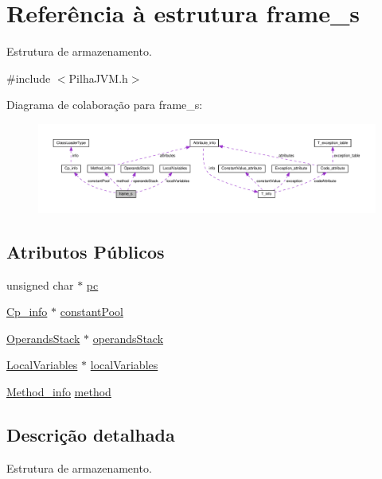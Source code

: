 \hypertarget{structframe__s}{}\section{Referência à estrutura frame\+\_\+s}
\label{structframe__s}


Estrutura de armazenamento.  




{\ttfamily \#include $<$Pilha\+J\+V\+M.\+h$>$}



Diagrama de colaboração para frame\+\_\+s\+:\nopagebreak
\begin{figure}[H]
\begin{center}
\leavevmode
\includegraphics[width=350pt]{structframe__s__coll__graph}
\end{center}
\end{figure}
\subsection*{Atributos Públicos}
\begin{DoxyCompactItemize}
\item 
unsigned char $\ast$ \hyperlink{structframe__s_a74703c716b34b0be42af1c698ef9f621}{pc}
\item 
\hyperlink{structCp__info}{Cp\+\_\+info} $\ast$ \hyperlink{structframe__s_a87635828c425af2fef349dd22400fe99}{constant\+Pool}
\item 
\hyperlink{classOperandsStack}{Operands\+Stack} $\ast$ \hyperlink{structframe__s_ac26720ef0e7627d29c868eba6a15bfc1}{operands\+Stack}
\item 
\hyperlink{classLocalVariables}{Local\+Variables} $\ast$ \hyperlink{structframe__s_ab8c8d556e0b3a59ce604754a0e3634bb}{local\+Variables}
\item 
\hyperlink{structMethod__info}{Method\+\_\+info} \hyperlink{structframe__s_a9449132746fe7f38ff9048503b59065f}{method}
\end{DoxyCompactItemize}


\subsection{Descrição detalhada}
Estrutura de armazenamento. 

